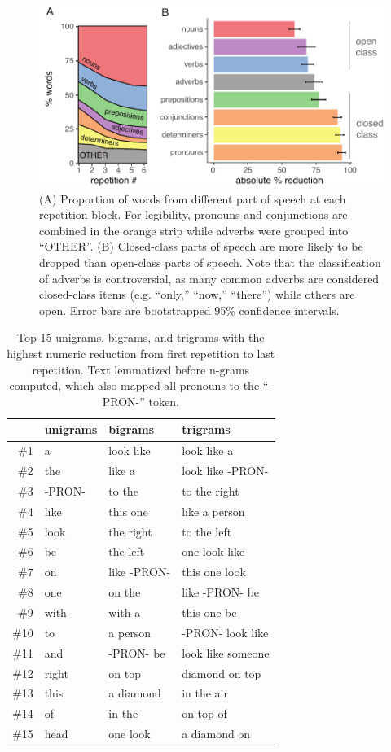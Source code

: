\documentclass[alpha-refs]{wiley-article}
\begin{document}
\begin{figure}[t!]
\centering
\includegraphics[scale=.8]{posResults.pdf}
\caption{(A) Proportion of words from different part of speech at each repetition block. For legibility, pronouns and conjunctions are combined in the orange strip while adverbs were grouped into ``OTHER''. (B) Closed-class parts of speech are more likely to be dropped than open-class parts of speech. Note that the classification of adverbs is controversial, as many common adverbs are considered closed-class items (e.g. ``only,'' ``now,'' ``there'') while others are open. Error bars are bootstrapped 95\% confidence intervals.}
\label{fig:pos}
\end{figure}

\begin{table}[t]
\centering
\begin{tabular}{|r||l|l|l|}
  \hline
 & unigrams & bigrams & trigrams \\
  \hline
\#1 & a & look like & look like a \\
  \#2 & the & like a & look like -PRON- \\
  \#3 & -PRON- & to the & to the right \\
  \#4 & like & this one & like a person \\
  \#5 & look & the right & to the left \\
  \#6 & be & the left & one look like \\
  \#7 & on & like -PRON- & this one look \\
  \#8 & one & on the & like -PRON- be \\
  \#9 & with & with a & this one be \\
  \#10 & to & a person & -PRON- look like \\
  \#11 & and & -PRON- be & look like someone \\
  \#12 & right & on top & diamond on top \\
  \#13 & this & a diamond & in the air \\
  \#14 & of & in the & on top of \\
  \#15 & head & one look & a diamond on \\
   \hline
\end{tabular}
\caption{Top 15 unigrams, bigrams, and trigrams with the highest numeric reduction from first repetition to last repetition. Text lemmatized before n-grams computed, which also mapped all pronouns to the ``-PRON-'' token. }
\label{tab:words}
\end{table}
\end{document}
